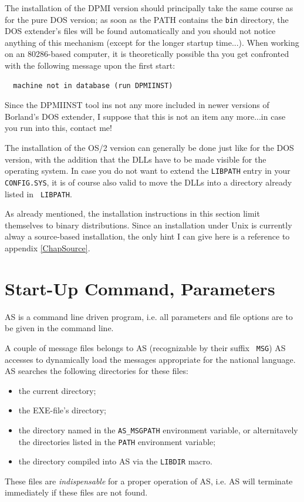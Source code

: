 \documentclass[12pt,twoside]{report}
\newcommand{\asname}{{AS}}
\begin{document}
The installation of the DPMI version  should
principally take the same course as for the pure DOS version; as soon as
the PATH contains the {\tt bin} directory, the DOS extender's files will
be found automatically and you should not notice anything of this
mechanism (except for the longer startup time...).  When working on an
80286-based computer, it is theoretically possible tha you get confronted
with the following message upon the first start:
\begin{verbatim}
  machine not in database (run DPMIINST)
\end{verbatim}
Since the DPMIINST tool ins not any more included in newer versions of
Borland's DOS extender, I suppose that this is not an item any more...in
case you run into this, contact me!

The installation of the OS/2 version  can generally
be done just like for the DOS version, with the addition that the DLLs
have to be made visible for the operating system. In case you do not want
to extend the {\tt LIBPATH} entry in your {\tt CONFIG.SYS}, it is of
course also valid to move the DLLs into a directory already listed in {\tt
LIBPATH}.

As already mentioned, the installation instructions in this section limit
themselves to binary distributions.  Since an installation under Unix
 is currently alway a source-based installation, the
only hint I can give here is a reference to appendix \ref{ChapSource}.


\section{Start-Up Command, Parameters}
\label{SectCallConvention}

\asname{} is a command line driven program, i.e. all parameters and file
options are to be given in the command line.

A couple of message files belongs to \asname{} (recognizable by their suffix {\tt
MSG}) \asname{} accesses to dynamically load the messages appropriate for the
national language.  \asname{} searches the following directories for these files:
\begin{itemize}
\item{the current directory;}
\item{the EXE-file's directory;}
\item{the directory named in the {\tt AS\_MSGPATH} environment variable,
      or alternitavely the directories listed in the {\tt PATH} environment
      variable;}
\item{the directory compiled into \asname{} via the {\tt LIBDIR} macro.}
\end{itemize}
These files are {\em indispensable} for a proper operation of \asname{}, i.e. \asname{}
will terminate immediately if these files are not found.
\end{document}
